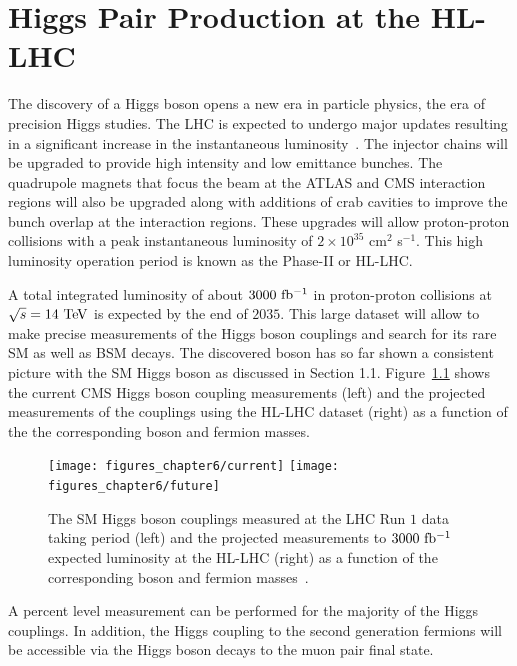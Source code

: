 

\providecommand{\phasezero}{Phase-0 }
\providecommand{\phaseone}{Phase-I }
\providecommand{\phasetwo}{Phase-II }

\chapter{Higgs Pair Production at the HL-LHC}

The discovery of a Higgs boson opens a new era in particle physics, the era of precision Higgs studies. The LHC is expected to undergo major updates resulting in a significant increase in the instantaneous luminosity~\cite{Apollinari:2116337}.  The injector chains will be upgraded to provide high intensity and low emittance bunches. The quadrupole magnets that focus the beam at the ATLAS and CMS interaction regions will also be upgraded along with additions of crab cavities to improve the bunch overlap at the interaction regions. These upgrades will allow proton-proton collisions with a peak instantaneous luminosity of $2\times10^{35}$ cm$^2$ s$^{-1}$. This high luminosity operation period is known as the \phasetwo or HL-LHC. 

A total integrated luminosity of about $3000~\mathrm{fb^{-1}}$ in proton-proton collisions at $\sqrt{s}=14~\mathrm{Te\kern -0.1em V}$ is expected by the end of $2035$. This large dataset will allow to make precise measurements of the Higgs boson couplings and search for its rare SM as well as BSM decays. The discovered boson has so far shown a consistent picture with the SM Higgs boson as discussed in Section 1.1. Figure~\ref{fig:coupling} shows the current CMS Higgs boson coupling measurements (left) and the projected measurements of the couplings using the HL-LHC dataset (right) as a function of the the corresponding boson and fermion masses.      
\begin{figure}[hbtp]
  \begin{center}
    \texttt{[image: figures\_chapter6/current]}
    \texttt{[image: figures\_chapter6/future]}       
    \caption{The SM Higgs boson couplings measured at the LHC Run $1$ data taking period (left) and the projected measurements to $3000~\mathrm{fb^{-1}}$ expected luminosity at the HL-LHC (right) as a function of the corresponding boson and fermion masses~\cite{Butler:2020886}.}
    \label{fig:coupling}
  \end{center}
\end{figure}
A percent level measurement can be performed for the majority of the Higgs couplings. In addition, the Higgs coupling to the second generation fermions will be accessible via the Higgs boson decays to the muon pair final state. 

